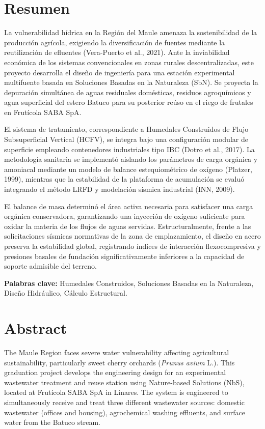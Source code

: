 \documentclass[12pt, letterpaper]{report}
\begin{document}
\chapter*{Resumen}

La vulnerabilidad hídrica en la Región del Maule amenaza la sostenibilidad de la producción agrícola, exigiendo la diversificación de fuentes mediante la reutilización de efluentes (Vera-Puerto et al., 2021). Ante la inviabilidad económica de los sistemas convencionales en zonas rurales descentralizadas, este proyecto desarrolla el diseño de ingeniería para una estación experimental multifuente basada en Soluciones Basadas en la Naturaleza (SbN). Se proyecta la depuración simultánea de aguas residuales domésticas, residuos agroquímicos y agua superficial del estero Batuco para su posterior reúso en el riego de frutales en Frutícola SABA SpA.

El sistema de tratamiento, correspondiente a Humedales Construidos de Flujo Subsuperficial Vertical (HCFV), se integra bajo una configuración modular de superficie empleando contenedores industriales tipo IBC (Dotro et al., 2017). La metodología sanitaria se implementó aislando los parámetros de carga orgánica y amoniacal mediante un modelo de balance estequiométrico de oxígeno (Platzer, 1999), mientras que la estabilidad de la plataforma de acumulación se evaluó integrando el método LRFD y modelación sísmica industrial (INN, 2009).

El balance de masa determinó el área activa necesaria para satisfacer una carga orgánica conservadora, garantizando una inyección de oxígeno suficiente para oxidar la materia de los flujos de aguas servidas. Estructuralmente, frente a las solicitaciones sísmicas normativas de la zona de emplazamiento, el diseño en acero preserva la estabilidad global, registrando índices de interacción flexocompresiva y presiones basales de fundación significativamente inferiores a la capacidad de soporte admisible del terreno.

\vspace{0.5cm}
\noindent\textbf{Palabras clave:} Humedales Construidos, Soluciones Basadas en la Naturaleza, Diseño Hidráulico, Cálculo Estructural.

\newpage

\chapter*{Abstract}
The Maule Region faces severe water vulnerability affecting agricultural sustainability, particularly sweet cherry orchards (\textit{Prunus avium} L.). This graduation project develops the engineering design for an experimental wastewater treatment and reuse station using Nature-based Solutions (NbS), located at Frutícola SABA SpA in Linares. The system is engineered to simultaneously receive and treat three different wastewater sources: domestic wastewater (offices and housing), agrochemical washing effluents, and surface water from the Batuco stream.
\end{document}
